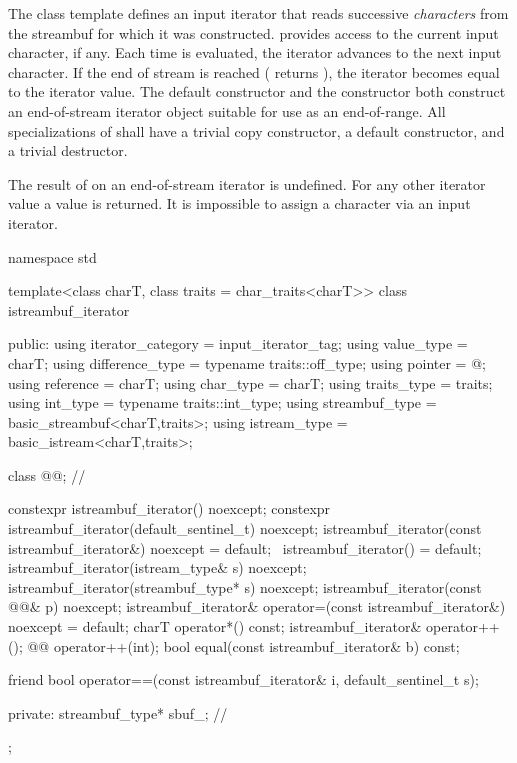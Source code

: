 \pnum
The
class template
defines an input iterator that
reads successive
\textit{characters}
from the streambuf for which it was constructed.
provides access to the current input character, if any.
Each time
is evaluated, the iterator advances to the next input character.
If the end of stream is reached ( returns
),
the iterator becomes equal to the
iterator value.
The default constructor
and the constructor
both construct an end-of-stream iterator object suitable for use
as an end-of-range.
All specializations of  shall have a trivial copy
constructor, a  default constructor, and a trivial destructor.

\pnum
The result of
on an end-of-stream iterator is undefined.
%
For any other iterator value a
value is returned.
It is impossible to assign a character via an input iterator.

%
\begin{codeblock}
namespace std {
  template<class charT, class traits = char_traits<charT>>
  class istreambuf_iterator {
  public:
    using iterator_category = input_iterator_tag;
    using value_type        = charT;
    using difference_type   = typename traits::off_type;
    using pointer           = @\unspec@;
    using reference         = charT;
    using char_type         = charT;
    using traits_type       = traits;
    using int_type          = typename traits::int_type;
    using streambuf_type    = basic_streambuf<charT,traits>;
    using istream_type      = basic_istream<charT,traits>;

    class @@;                          // \expos

    constexpr istreambuf_iterator() noexcept;
    constexpr istreambuf_iterator(default_sentinel_t) noexcept;
    istreambuf_iterator(const istreambuf_iterator&) noexcept = default;
    ~istreambuf_iterator() = default;
    istreambuf_iterator(istream_type& s) noexcept;
    istreambuf_iterator(streambuf_type* s) noexcept;
    istreambuf_iterator(const @@& p) noexcept;
    istreambuf_iterator& operator=(const istreambuf_iterator&) noexcept = default;
    charT operator*() const;
    istreambuf_iterator& operator++();
    @@ operator++(int);
    bool equal(const istreambuf_iterator& b) const;

    friend bool operator==(const istreambuf_iterator& i, default_sentinel_t s);

  private:
    streambuf_type* sbuf_;              // \expos
  };
}
\end{codeblock}

